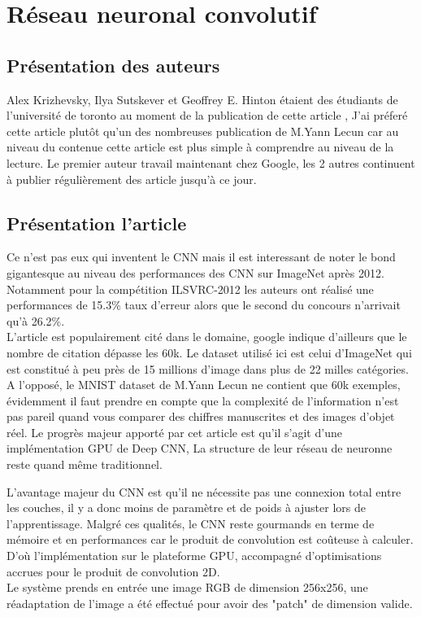 \documentclass[12pt, letterpaper]{article}
\begin{document}
\section{Réseau neuronal convolutif}
\subsection{Présentation des auteurs}
Alex Krizhevsky, Ilya Sutskever et Geoffrey E. Hinton étaient des étudiants de l'université de toronto au moment de la publication 
de cette article \autocite{NIPS2012_4824:3}, J'ai préferé cette article plutôt qu'un des nombreuses publication de M.Yann Lecun car au niveau 
du contenue cette article est plus simple à comprendre au niveau de la lecture.
Le premier auteur travail maintenant chez Google, les 2 autres continuent à publier régulièrement des article jusqu'à ce jour.

\subsection{Présentation l'article}
\par Ce n'est pas eux qui inventent le CNN mais il est interessant de noter le bond gigantesque au niveau des performances des CNN sur ImageNet après 2012.
Notamment pour la compétition ILSVRC-2012 les auteurs ont réalisé une performances de 15.3\% taux d'erreur alors que le second 
du concours n'arrivait qu'à 26.2\%.\\
L'article est populairement cité dans le domaine, google indique d'ailleurs que le nombre de citation dépasse les 60k.
Le dataset utilisé ici est celui d'ImageNet qui est constitué à peu près de 15 millions d'image dans plus de 22 milles catégories.
A l'opposé, le MNIST dataset de M.Yann Lecun ne contient que 60k exemples, évidemment il faut prendre en compte que la complexité 
de l'information n'est pas pareil quand vous comparer des chiffres manuscrites et des images d'objet réel.
Le progrès majeur apporté par cet article est qu'il s'agit d'une implémentation GPU de Deep CNN, La structure de leur réseau de neuronne 
reste quand même traditionnel.
\par L'avantage majeur du CNN est qu'il ne nécessite pas une connexion total entre les couches, il y a donc moins de paramètre et de poids à ajuster lors
de l'apprentissage. Malgré ces qualités, le CNN reste gourmands en terme de mémoire et en performances car le produit de convolution est coûteuse à calculer.
D'où l'implémentation sur le plateforme GPU, accompagné d'optimisations accrues pour le produit de convolution 2D. \\
Le système prends en entrée une image RGB de dimension 256x256, une réadaptation de l'image a été effectué pour avoir des "patch" de dimension valide.
\end{document}
